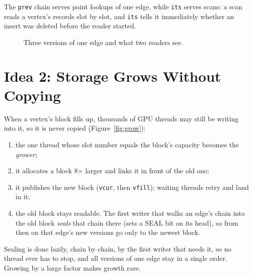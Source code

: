 \documentclass[11pt,a4paper,oneside]{report}
\newcommand{\code}[1]{\texttt{#1}}
\begin{document}
The \code{prev} chain serves point lookups of one edge, while \code{its} serves scans: a scan reads a vertex's records
slot by slot, and \code{its} tells it immediately whether an insert was deleted before the reader started.

\begin{figure}[H]
\centering
{}
\caption{Three versions of one edge and what two readers see.}
\label{fig:chain}
\end{figure}

\section{Idea 2: Storage Grows Without Copying}
When a vertex's block fills up, thousands of GPU threads may still be writing into it, so it is never copied
(Figure~\ref{fig:grow}):
\begin{enumerate}
\item the one thread whose slot number equals the block's capacity becomes the \emph{grower};
\item it allocates a block 8$\times$ larger and links it in front of the old one;
\item it publishes the new block (\code{vcur}, then \code{vfill}); waiting threads retry and land in it;
\item the old block stays readable. The first writer that walks an edge's chain into the old block \emph{seals} that
  chain there (sets a SEAL bit on its head), so from then on that edge's new versions go only to the newest block.
\end{enumerate}
Sealing is done lazily, chain by chain, by the first writer that needs it, so no thread ever has to stop, and all
versions of one edge stay in a single order. Growing by a large factor makes growth rare.
\end{document}

